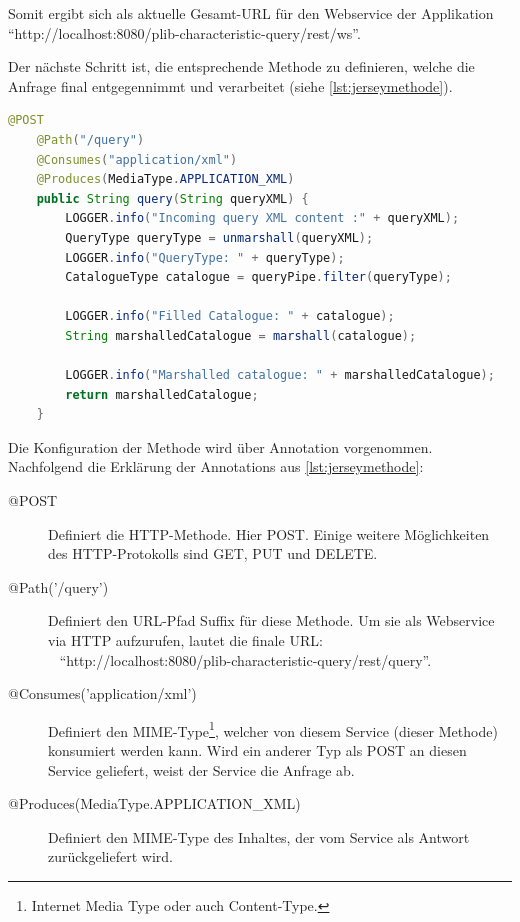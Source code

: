 Somit ergibt sich als aktuelle Gesamt-\gls{URL} für den \gls{Webservice} der Applikation \\  \enquote{http://localhost:8080/plib-characteristic-query/rest/ws}.
 
Der nächste Schritt ist, die entsprechende Methode zu definieren, welche die Anfrage final entgegennimmt und verarbeitet (siehe \autoref{lst:jerseymethode}). 
 
  \begin{lstlisting}[caption=Jersey Methode, language=Java, label=lst:jerseymethode]
    @POST
    @Path("/query")
    @Consumes("application/xml")
    @Produces(MediaType.APPLICATION_XML)
    public String query(String queryXML) {
        LOGGER.info("Incoming query XML content :" + queryXML);
        QueryType queryType = unmarshall(queryXML);
        LOGGER.info("QueryType: " + queryType);
        CatalogueType catalogue = queryPipe.filter(queryType);

        LOGGER.info("Filled Catalogue: " + catalogue);
        String marshalledCatalogue = marshall(catalogue);

        LOGGER.info("Marshalled catalogue: " + marshalledCatalogue);
        return marshalledCatalogue;
    }
 \end{lstlisting}  

Die Konfiguration der Methode wird über \Gls{Annotation} vorgenommen. Nachfolgend die Erklärung der \Glspl{Annotation} aus \autoref{lst:jerseymethode}:

\begin{description}
\item[@POST] Definiert die \gls{HTTP-Methode}. Hier \gls{POST}. Einige weitere Möglichkeiten des \gls{HTTP}-Protokolls sind GET, PUT und DELETE.
\item[@Path('/query')] Definiert den URL-Pfad Suffix für diese Methode. Um sie als \gls{Webservice} via \gls{HTTP} aufzurufen, lautet die finale URL: \\~
\enquote{http://localhost:8080/plib-characteristic-query/rest/query}. 
\item[@Consumes('application/xml')] Definiert den \gls{MIME-Type}\footnote{Internet Media Type oder auch Content-Type.}, welcher von diesem Service (dieser Methode) konsumiert werden kann. Wird ein anderer Typ als POST an diesen Service geliefert, weist der Service die Anfrage ab. 
\item[@Produces(MediaType.APPLICATION\_XML)] Definiert den \gls{MIME-Type} des Inhaltes, der vom Service als Antwort zurückgeliefert wird.  
\end{description}

